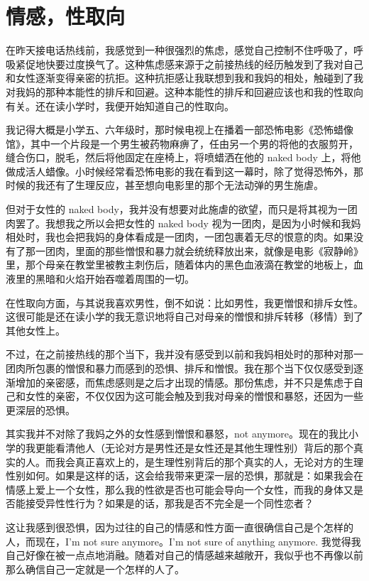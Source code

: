 \chapter{情感，性取向}



在昨天接电话热线前，我感觉到一种很强烈的焦虑，感觉自己控制不住呼吸了，呼吸紧促地快要过度换气了。这种焦虑感来源于之前接热线的经历触发到了我对自己和女性逐渐变得亲密的抗拒。这种抗拒感让我联想到我和我妈的相处，触碰到了我对我妈的那种本能性的排斥和回避。这种本能性的排斥和回避应该也和我的性取向有关。还在读小学时，我便开始知道自己的性取向。

我记得大概是小学五、六年级时，那时候电视上在播着一部恐怖电影《恐怖蜡像馆》，其中一个片段是一个男生被药物麻痹了，任由另一个男的将他的衣服剪开，缝合伤口，脱毛，然后将他固定在座椅上，将喷蜡洒在他的 naked body 上，将他做成活人蜡像。小时候经常看恐怖电影的我在看到这一幕时，除了觉得恐怖外，那时候的我还有了生理反应，甚至想向电影里的那个无法动弹的男生施虐。

但对于女性的 naked body，我并没有想要对此施虐的欲望，而只是将其视为一团肉罢了。我想我之所以会把女性的 naked body 视为一团肉，是因为小时候和我妈相处时，我也会把我妈的身体看成是一团肉，一团包裹着无尽的恨意的肉。如果没有了那一团肉，里面的那些憎恨和暴力就会统统释放出来，就像是电影《寂静岭》里，那个母亲在教堂里被教主刺伤后，随着体内的黑色血液滴在教堂的地板上，血液里的黑暗和火焰开始吞噬着周围的一切。

在性取向方面，与其说我喜欢男性，倒不如说：比如男性，我更憎恨和排斥女性。这很可能是还在读小学的我无意识地将自己对母亲的憎恨和排斥转移（移情）到了其他女性上。

不过，在之前接热线的那个当下，我并没有感受到以前和我妈相处时的那种对那一团肉所包裹的憎恨和暴力而感到的恐惧、排斥和憎恨。我在那个当下仅仅感受到逐渐增加的亲密感，而焦虑感则是之后才出现的情感。那份焦虑，并不只是焦虑于自己和女性的亲密，不仅仅因为这可能会触及到我对母亲的憎恨和暴怒，还因为一些更深层的恐惧。

其实我并不对除了我妈之外的女性感到憎恨和暴怒，not anymore。现在的我比小学的我更能看清他人（无论对方是男性还是女性还是其他生理性别）背后的那个真实的人。而我会真正喜欢上的，是生理性别背后的那个真实的人，无论对方的生理性别如何。如果是这样的话，这会给我带来更深一层的恐惧，那就是：如果我会在情感上爱上一个女性，那么我的性欲是否也可能会导向一个女性，而我的身体又是否能接受异性性行为？如果是的话，那我是否不完全是一个同性恋者？

这让我感到很恐惧，因为过往的自己的情感和性方面一直很确信自己是个怎样的人，而现在，I'm not sure anymore。I'm not sure of anything anymore. 我觉得我自己好像在被一点点地消融。随着对自己的情感越来越敞开，我似乎也不再像以前那么确信自己一定就是一个怎样的人了。
